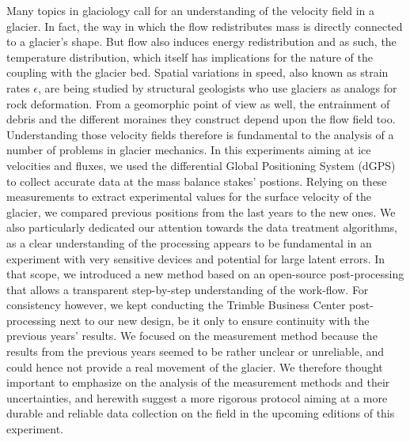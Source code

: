 Many topics in glaciology call for an understanding of the velocity field in a glacier. 
In fact, the way in which the flow redistributes mass is directly connected to a glacier's shape. But flow also induces energy redistribution and as such, the temperature distribution, which itself has implications for the nature of the coupling with the glacier bed. 
Spatial variations in speed, also known as strain rates $\epsilon$, are being studied by structural geologists who use glaciers as analogs for rock deformation. 
From a geomorphic point of view as well, the entrainment of debris and the different moraines they construct depend upon the flow field too. 
Understanding those velocity fields therefore is fundamental to the analysis of a number of problems in glacier mechanics.
In this experiments aiming at ice velocities and fluxes, we used the differential Global Positioning System (dGPS) to collect accurate data at the mass balance stakes' postions. Relying on these measurements to extract experimental values for the surface velocity of the glacier, we compared previous positions from the last years to the new ones.
We also particularly dedicated our attention towards the data treatment algorithms, as a clear understanding of the processing appears to be fundamental in an experiment with very sensitive devices and potential for large latent errors. In that scope, we introduced a new method based on an open-source post-processing that allows a transparent step-by-step understanding of the work-flow.
For consistency however, we kept conducting the Trimble Business Center post-processing next to our new design, be it only to ensure continuity with the previous years' results.
We focused on the measurement method because the results from the previous years seemed to be rather unclear or unreliable, and could hence not provide a real movement of the glacier. We therefore thought important to emphasize on the analysis of the measurement methods and their uncertainties, and herewith suggest a more rigorous protocol aiming at a more durable and reliable data collection on the field in the upcoming editions of this experiment.
\medskip 

